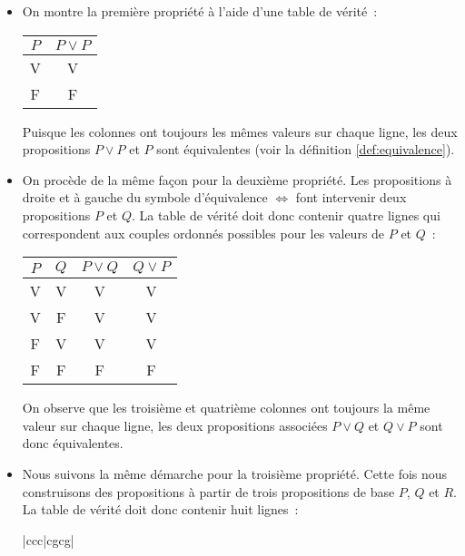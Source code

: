 \documentclass[10pt,notheorems]{beamer}
\theoremstyle{plain}
\theoremstyle{definition} %
\begin{document}
\begin{notes}
  \begin{itemize}
  \item On montre la première propriété à l'aide d'une table de
    vérité~:
    \begin{table}
      \centering
      \begin{tabular}[H]{|c|c|}
        \hline
        $P$ & $P \lor P$ \\ \hline
        V & V \\
        F & F \\
        \hline\hline
      \end{tabular}
    \end{table}
    Puisque les colonnes ont toujours les mêmes valeurs sur chaque
    ligne, les deux propositions $P\lor P$ et $P$ sont équivalentes
    (voir la définition \hyperlink{slide_equivalence_logique_1}{\ref{def:equivalence}}).
  \item On procède de la même façon pour la deuxième propriété. Les
    propositions à droite et à gauche du symbole d'équivalence
    $\Leftrightarrow$ font intervenir deux propositions $P$ et
    $Q$. La table de vérité doit donc contenir quatre lignes qui
    correspondent aux couples ordonnés possibles pour les
    valeurs de $P$ et $Q$~:
    \begin{table}[H]
      \centering
      \begin{tabular}[H]{|cc|cc|}
        \hline
        $P$ & $Q$ & $P \lor Q$ & $Q \lor P$\\ \hline
        V & V & V & V\\
        V & F & V & V\\
        F & V & V & V\\
        F & F & F & F \\
        \hline\hline
      \end{tabular}
    \end{table}
    On observe que les troisième et quatrième colonnes ont toujours
    la même valeur sur chaque ligne, les deux propositions associées
    $P \lor Q$ et $Q \lor P$ sont donc
    équivalentes.
  \item Nous suivons la même démarche pour la troisième
    propriété. Cette fois nous construisons des propositions à
    partir de trois propositions de base $P$, $Q$ et $R$. La table
    de vérité doit donc contenir huit lignes~:
    \begin{table}[H]
      \centering
      \begin{tabular}[H]{|ccc|cgcg|}

\end{tabular}
\end{table}
\end{itemize}
\end{notes}
\end{document}
